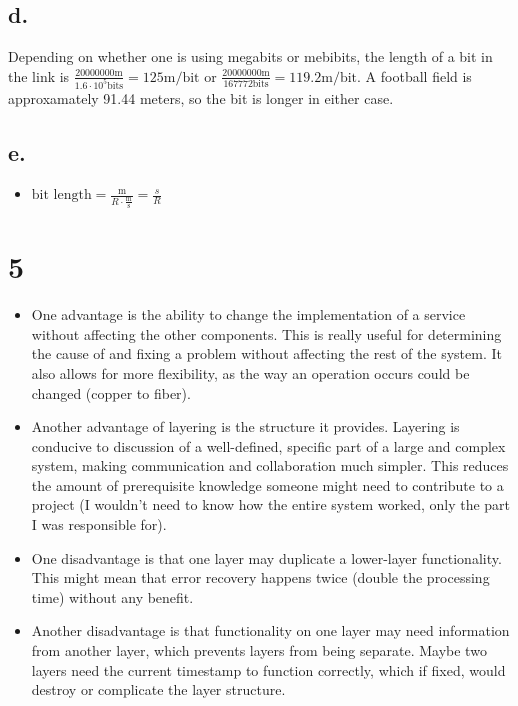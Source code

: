 \documentclass[11pt]{article}
\begin{document}
\subsection*{d.}
\label{sec:org0682be8}
Depending on whether one is using megabits or mebibits, the length of a bit in
the link is \(\frac{20000000 \text{m}}{1.6 \cdot 10^5\text{bits}} = 125
\text{m/bit}\) or \(\frac{20000000 \text{m}}{167772\text{bits}} = 119.2
\text{m/bit}\). A football field is approxamately 91.44 meters, so the bit is
longer in either case.
\subsection*{e.}
\label{sec:org0d3afbf}
\begin{itemize}
\item \(\text{bit length} = \frac{\text{m}}{R \cdot \frac{\text{m}}{\text{s}}} = \frac{s}{R}\)
\end{itemize}

\section*{5}
\label{sec:orge041000}
\begin{itemize}
\item One advantage is the ability to change the implementation of a service without
affecting the other components. This is really useful for determining the
cause of and fixing a problem without affecting the rest of the system. It
also allows for more flexibility, as the way an operation occurs could be
changed (copper to fiber).
\item Another advantage of layering is the structure it provides. Layering is
conducive to discussion of a well-defined, specific part of a large and
complex system, making communication and collaboration much simpler. This
reduces the amount of prerequisite knowledge someone might need to contribute
to a project (I wouldn't need to know how the entire system worked, only
the part I was responsible for).
\item One disadvantage is that one layer may duplicate a lower-layer functionality.
This might mean that error recovery happens twice (double the processing time)
without any benefit.
\item Another disadvantage is that functionality on one layer may need information
from another layer, which prevents layers from being separate. Maybe two
layers need the current timestamp to function correctly, which if fixed, would
destroy or complicate the layer structure.
\end{itemize}
\end{document}
